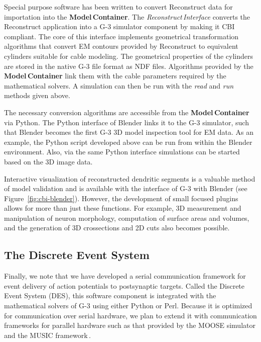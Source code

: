 \documentclass[12pt]{article}
\begin{document}

Special purpose software has been written to convert Reconstruct data
for importation into the {\bf Model\,Container}.  The {\it
  Reconstruct\,Interface} converts the Reconstruct application into a
G-3 simulator component by making it CBI compliant.
The core of this interface implements geometrical transformation
algorithms that convert EM contours provided by Reconstruct to
equivalent cylinders suitable for cable modeling.
The geometrical properties of the cylinders are stored in the native G-3 file format as NDF files. Algorithms provided by the {\bf Model\,Container} link them with
the cable parameters required by the mathematical solvers.  A
simulation can then be run with the {\it read} and {\it run} methods
given above.

The necessary conversion algorithms are accessible from the
{\bf Model\,Container} via Python.  The Python interface of Blender links it to the G-3
simulator, such that Blender becomes the first G-3 3D model inspection
tool for EM data.  As an example, the Python script developed above
can be run from within the Blender environment.  Also, via the same
Python interface simulations can be started based on the 3D image
data.

Interactive visualization of reconstructed dendritic segments is a
valuable method of model validation and is available with the
interface of G-3 with Blender (see Figure~\ref{fig:cbi-blender}).
However, the development of small focused plugins allows for more than
just these functions. For example, 3D measurement and manipulation of
neuron morphology, computation of surface areas and volumes, and the
generation of 3D crossections and 2D cuts also becomes possible.

\subsection{The Discrete Event System}

Finally, we note that we have developed a serial communication
framework for event delivery of action potentials to postsynaptic
targets.  Called the Discrete Event System (DES), this software component is
integrated with the mathematical solvers of G-3 using either Python or
Perl.  Because it is optimized for communication over serial hardware,
we plan to extend it with communication frameworks for parallel
hardware such as that provided by the MOOSE
simulator\,\cite{ray08:_pymoos} and the MUSIC
framework\,\cite{ekeberg08:_music_multis_coord}.
\end{document}
